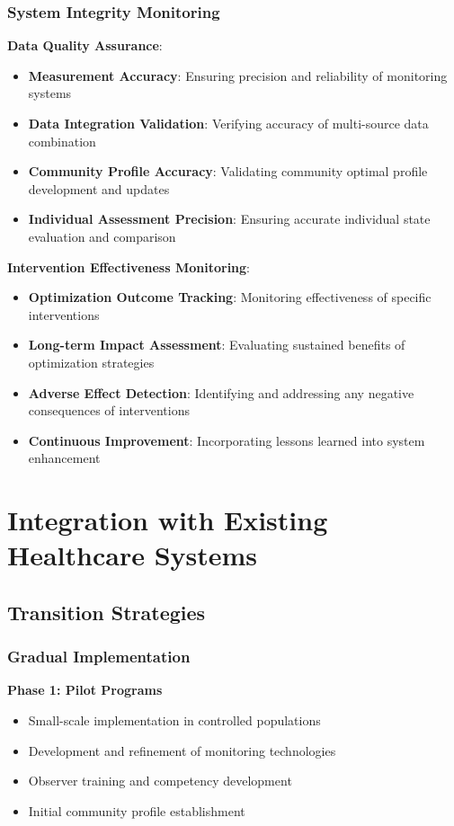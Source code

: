 \documentclass[12pt,a4paper]{article}
\begin{document}
\subsubsection{System Integrity Monitoring}

\textbf{Data Quality Assurance}:
\begin{itemize}
\item \textbf{Measurement Accuracy}: Ensuring precision and reliability of monitoring systems
\item \textbf{Data Integration Validation}: Verifying accuracy of multi-source data combination
\item \textbf{Community Profile Accuracy}: Validating community optimal profile development and updates
\item \textbf{Individual Assessment Precision}: Ensuring accurate individual state evaluation and comparison
\end{itemize}

\textbf{Intervention Effectiveness Monitoring}:
\begin{itemize}
\item \textbf{Optimization Outcome Tracking}: Monitoring effectiveness of specific interventions
\item \textbf{Long-term Impact Assessment}: Evaluating sustained benefits of optimization strategies
\item \textbf{Adverse Effect Detection}: Identifying and addressing any negative consequences of interventions
\item \textbf{Continuous Improvement}: Incorporating lessons learned into system enhancement
\end{itemize}

\section{Integration with Existing Healthcare Systems}

\subsection{Transition Strategies}

\subsubsection{Gradual Implementation}

\textbf{Phase 1: Pilot Programs}
\begin{itemize}
\item Small-scale implementation in controlled populations
\item Development and refinement of monitoring technologies
\item Observer training and competency development
\item Initial community profile establishment
\end{itemize}
\end{document}
